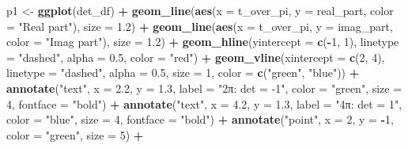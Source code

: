 \documentclass[
]{book}
\newenvironment{Shaded}{\begin{snugshade}}{\end{snugshade}}
\newcommand{\AttributeTok}[1]{\textcolor[rgb]{0.13,0.29,0.53}{#1}}
\newcommand{\DecValTok}[1]{\textcolor[rgb]{0.00,0.00,0.81}{#1}}
\newcommand{\FloatTok}[1]{\textcolor[rgb]{0.00,0.00,0.81}{#1}}
\newcommand{\FunctionTok}[1]{\textcolor[rgb]{0.13,0.29,0.53}{\textbf{#1}}}
\newcommand{\NormalTok}[1]{#1}
\newcommand{\OtherTok}[1]{\textcolor[rgb]{0.56,0.35,0.01}{#1}}
\newcommand{\SpecialCharTok}[1]{\textcolor[rgb]{0.81,0.36,0.00}{\textbf{#1}}}
\newcommand{\StringTok}[1]{\textcolor[rgb]{0.31,0.60,0.02}{#1}}
\theoremstyle{definition}
\theoremstyle{definition}
\theoremstyle{definition}
\theoremstyle{definition}
\theoremstyle{remark}
\begin{document}
\begin{Shaded}
\begin{Highlighting}[]
\NormalTok{p1 }\OtherTok{\textless{}{-}} \FunctionTok{ggplot}\NormalTok{(det\_df) }\SpecialCharTok{+}
  \FunctionTok{geom\_line}\NormalTok{(}\FunctionTok{aes}\NormalTok{(}\AttributeTok{x =}\NormalTok{ t\_over\_pi, }\AttributeTok{y =}\NormalTok{ real\_part, }\AttributeTok{color =} \StringTok{"Real part"}\NormalTok{), }\AttributeTok{size =} \FloatTok{1.2}\NormalTok{) }\SpecialCharTok{+}
  \FunctionTok{geom\_line}\NormalTok{(}\FunctionTok{aes}\NormalTok{(}\AttributeTok{x =}\NormalTok{ t\_over\_pi, }\AttributeTok{y =}\NormalTok{ imag\_part, }\AttributeTok{color =} \StringTok{"Imag part"}\NormalTok{), }\AttributeTok{size =} \FloatTok{1.2}\NormalTok{) }\SpecialCharTok{+}
  \FunctionTok{geom\_hline}\NormalTok{(}\AttributeTok{yintercept =} \FunctionTok{c}\NormalTok{(}\SpecialCharTok{{-}}\DecValTok{1}\NormalTok{, }\DecValTok{1}\NormalTok{), }\AttributeTok{linetype =} \StringTok{"dashed"}\NormalTok{, }\AttributeTok{alpha =} \FloatTok{0.5}\NormalTok{, }\AttributeTok{color =} \StringTok{"red"}\NormalTok{) }\SpecialCharTok{+}
  \FunctionTok{geom\_vline}\NormalTok{(}\AttributeTok{xintercept =} \FunctionTok{c}\NormalTok{(}\DecValTok{2}\NormalTok{, }\DecValTok{4}\NormalTok{), }\AttributeTok{linetype =} \StringTok{"dashed"}\NormalTok{, }\AttributeTok{alpha =} \FloatTok{0.5}\NormalTok{, }
             \AttributeTok{size =} \DecValTok{1}\NormalTok{, }\AttributeTok{color =} \FunctionTok{c}\NormalTok{(}\StringTok{"green"}\NormalTok{, }\StringTok{"blue"}\NormalTok{)) }\SpecialCharTok{+}
  \FunctionTok{annotate}\NormalTok{(}\StringTok{"text"}\NormalTok{, }\AttributeTok{x =} \FloatTok{2.2}\NormalTok{, }\AttributeTok{y =} \FloatTok{1.3}\NormalTok{, }\AttributeTok{label =} \StringTok{"2π: det = {-}1"}\NormalTok{, }
           \AttributeTok{color =} \StringTok{"green"}\NormalTok{, }\AttributeTok{size =} \DecValTok{4}\NormalTok{, }\AttributeTok{fontface =} \StringTok{"bold"}\NormalTok{) }\SpecialCharTok{+}
  \FunctionTok{annotate}\NormalTok{(}\StringTok{"text"}\NormalTok{, }\AttributeTok{x =} \FloatTok{4.2}\NormalTok{, }\AttributeTok{y =} \FloatTok{1.3}\NormalTok{, }\AttributeTok{label =} \StringTok{"4π: det = 1"}\NormalTok{, }
           \AttributeTok{color =} \StringTok{"blue"}\NormalTok{, }\AttributeTok{size =} \DecValTok{4}\NormalTok{, }\AttributeTok{fontface =} \StringTok{"bold"}\NormalTok{) }\SpecialCharTok{+}
  \FunctionTok{annotate}\NormalTok{(}\StringTok{"point"}\NormalTok{, }\AttributeTok{x =} \DecValTok{2}\NormalTok{, }\AttributeTok{y =} \SpecialCharTok{{-}}\DecValTok{1}\NormalTok{, }\AttributeTok{color =} \StringTok{"green"}\NormalTok{, }\AttributeTok{size =} \DecValTok{5}\NormalTok{) }\SpecialCharTok{+}

\end{Highlighting}
\end{Shaded}
\end{document}
